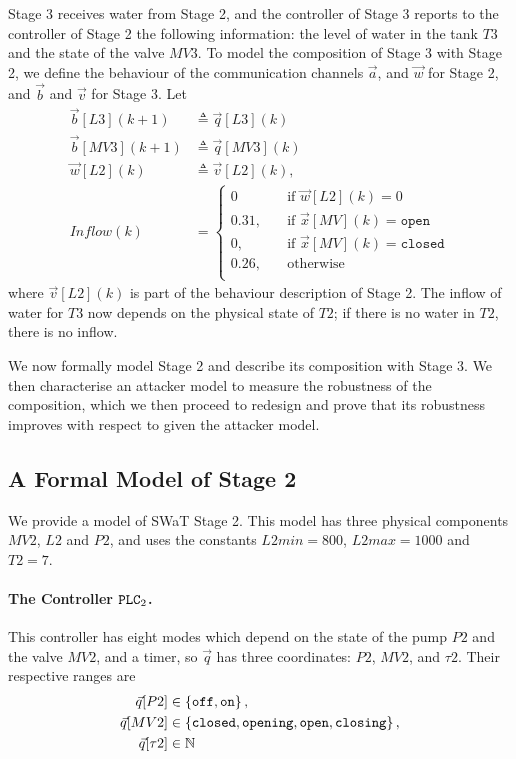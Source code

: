 {Stage 3 receives water from Stage 2, and the controller of Stage 3 reports to the controller of Stage 2 the following information: the level of water in the tank $T3$ and the state of the valve $MV3$. To model the composition of Stage 3 with Stage 2, we define the behaviour of the communication channels $\vec{a}$, and $\vec{w}$ for Stage 2, and $\vec{b}$ and $\vec{v}$ for Stage 3. Let  
\begin{align}
  \vec{b}[L3](k+1)&\triangleq \vec{q}[L3](k)\\
  \vec{b}[MV3](k+1)&\triangleq \vec{q}[MV3](k)\\
  \vec{w}[L2](k)&\triangleq \vec{v}[L2](k),\\
  Inflow(k)&=\begin{cases}
    0 & \quad \text{if $\vec{w}[L2](k)=0$}\\
    0.31,&\quad \text{if $\vec{x}[MV](k)=\texttt{open}$}\\
    0,&\quad \text{if $\vec{x}[MV](k)=\texttt{closed}$}\\
    0.26,&\quad \text{otherwise}\\
  \end{cases}
\end{align}
where $\vec{v}[L2](k)$ is part of the behaviour description of Stage 2. The inflow of water for $T3$ now depends on the physical state of $T2$; if there is no water in $T2$, there is no inflow.

We now formally model Stage 2 and describe its composition with Stage 3. We then characterise an attacker model to measure the robustness of the composition, which we then proceed to redesign and prove that its robustness improves with respect to given the attacker model.

\subsection{A Formal Model of Stage 2}
We provide a model of SWaT Stage 2. This model has three physical components $MV2$, $L2$ and $P2$, and uses the constants $L2min=800$, $L2max=1000$ and $T2=7$.

\paragraph{The Controller $\texttt{PLC}_2$.} 
This controller has eight modes which depend on the state of the pump $P2$ and the valve $MV2$, and a timer, so $\vec{q}$ has three coordinates: $P2$, $MV2$, and $\tau2$. Their respective ranges are 
\begin{align*}
  \vec{q}[P2]&\in\left\{\texttt{off},\texttt{on}\right\},\\
  \vec{q}[MV2]&\in\left\{\texttt{closed},\texttt{opening},\texttt{open},\texttt{closing}\right\},\\
  \vec{q}[\tau2]&\in\mathbb{N}
\end{align*}

}

